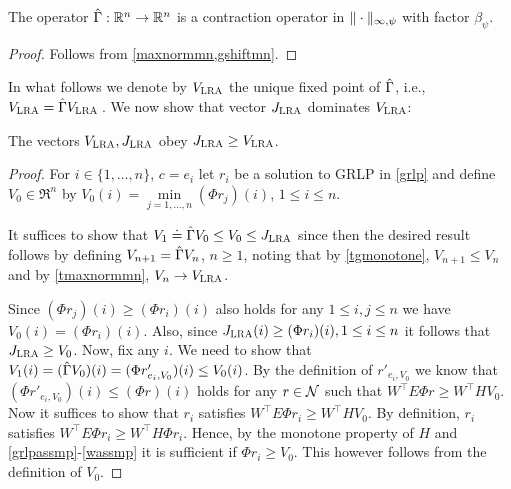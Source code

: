 \begin{comment}
\begin{theorem}\label{gmaxcontramn}
The operator $\Gamma  \colon \Re^n\ra \Re^n$ is a contraction operator in $\norm{\cdot}_{\mn}$ with factor $\beta_{\psi}$.
\end{theorem}
\end{comment}
\begin{theorem}\label{hgmaxcontramn}
The operator $\hat{\Gamma}:\mathbb{R}^n\to\mathbb{R}^n$  is a contraction operator in $\|\cdot\|_{\infty,\psi}$ with factor $\beta_{\psi}$.
\end{theorem}
\begin{proof}
Follows from \cref{maxnormmn,gshiftmn}.
\begin{comment}
We already know that $\hg$ is monotone. That $\hg$ satisfies~\cref{eq:shiftmn}
with $\beta = \beta_{\psi}$ follows similarly to the argument used in  \cref{tgshift}
with modifications similar to those introduced in the proof of \cref{gshiftmn}.
Then, \cref{gmaxcontramn} gives the desired result.
\end{comment}
\end{proof}
In what follows we denote by $V_{\text{\sc LRA}}$ the unique fixed point of $\hat{\Gamma}$, i.e., $V_{\text{\sc LRA}} = \hat{\Gamma} V_{\text{\sc LRA}}\,$. 
We now show that vector $J_{\text{\sc LRA}}$ dominates $V_{\text{\sc LRA}}$:
\begin{lemma}\label{relation1}
The vectors $V_{\text{\sc LRA}},J_{\text{\sc LRA}}$ obey $J_{\text{\sc LRA}}\geq V_{\text{\sc LRA}}$.
\end{lemma}
\begin{proof}
For $i\in \{1,\dots,n\}$, $c=e_i$ let $r_i$ be a solution to GRLP in \eqref{grlp}
and define $V_0\in \Re^n$ by $V_0(i)=\underset{j=1,\ldots,n}{\min}(\Phi r_j)(i)$, $1\le i \le n$.

It suffices to show that $V_1\doteq \hat{\Gamma} V_0 \le V_0 \le J_{\text{\sc LRA}}$ since then the desired result follows
by defining $V_{n+1} = \hat{\Gamma} V_n$, $n\ge 1$, noting that by \cref{tgmonotone}, $V_{n+1}\le V_{n}$ and by  \cref{tmaxnormmn}, $V_n \to V_{\text{\sc LRA}}$.

Since $(\Phi r_j)(i) \ge (\Phi r_i)(i)$ also holds for any $1\leq i,j\leq n$ we have $V_0(i)  = (\Phi r_i)(i)$. Also, since $J_{\text{\sc LRA}}(i) \ge (\Phi r_i)(i),1\leq i \leq n$ it follows that $J_{\text{\sc LRA}}\geq V_0$. 
Now,  fix any $i$. 
We need to show that $V_1(i)=(\hat{\Gamma} V_0)(i) = (\Phi r'_{e_i,V_0})(i) \leq V_0(i)$. 
By the definition of $r'_{e_i,V_0}$ we know that $(\Phi r'_{e_i,V_0})(i) \le (\Phi r)(i)$
holds for any $r\in \mathcal{N}$ such that $W^\top E \Phi r \ge W^\top H V_0$. 
Now it suffices to show that $r_i$ satisfies $W^\top E \Phi r_i \ge W^\top H V_0$. 
By definition, $r_i$ satisfies $W^\top E \Phi r_i \ge W^\top H \Phi r_i$.
Hence, by the monotone property of $H$ and \cref{grlpassmp}-\eqref{wassmp} it is sufficient if $\Phi r_i \ge V_0$.
This however follows from the definition of $V_0$.
\end{proof}
